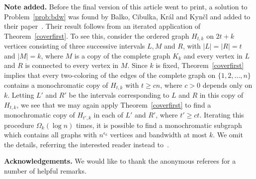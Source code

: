 \documentclass[11pt]{article}
\begin{document}
\noindent
{\bf Note added.} Before the final version of this article went to print, a solution to Problem~\ref{prob:bdw} was found by Balko, Cibulka, Kr\'al and Kyn\v cl and added to their paper~\cite{BCKK14}. Their result follows from an iterated application of Theorem~\ref{coverfirst}. To see this, consider the ordered graph $H_{t,k}$ on $2t + k$ vertices consisting of three successive intervals $L, M$ and $R$, with $|L| = |R| = t$ and $|M| = k$, where $M$ is a copy of the complete graph $K_k$ and every vertex in $L$ and $R$ is connected to every vertex in $M$. Since $k$ is fixed, Theorem~\ref{coverfirst} implies that every two-coloring of the edges of the complete graph on $\{1, 2, \dots, n\}$ contains a monochromatic copy of $H_{t,k}$ with $t \geq c n$, where $c > 0$ depends only on $k$. Letting $L'$ and $R'$ be the intervals corresponding to $L$ and $R$ in this copy of $H_{t,k}$, we see that we may again apply Theorem~\ref{coverfirst} to find a monochromatic copy of $H_{t',k}$ in each of $L'$ and $R'$, where $t' \geq c t$. Iterating this procedure $\Omega_k(\log n)$ times, it is possible to find a monochromatic subgraph which contains all graphs with $n^{\epsilon_k}$ vertices and bandwidth at most $k$. We omit the details, referring the interested reader instead to~\cite{BCKK14}.

\vspace{3mm}
\noindent
{\bf Acknowledgements.} We would like to thank the anonymous referees for a number of helpful remarks.
\end{document}
